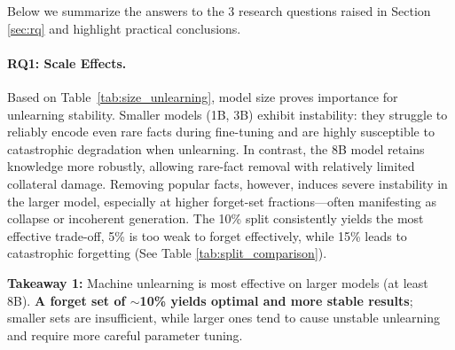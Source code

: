 \documentclass[11pt]{article}
\begin{document}
{    %

    

Below we summarize the answers to the 3 research questions raised in Section \ref{sec:rq} and highlight practical conclusions.

\paragraph{RQ1: Scale Effects.}  
Based on Table~\ref{tab:size_unlearning}, model size proves importance for unlearning stability. Smaller models (1B, 3B) exhibit instability: they struggle to reliably encode even rare facts during fine-tuning and are highly susceptible to catastrophic degradation when unlearning. In contrast, the 8B model retains knowledge more robustly, allowing rare-fact removal with relatively limited collateral damage. Removing popular facts, however, induces severe instability in the larger model, especially at higher forget-set fractions—often manifesting as collapse or incoherent generation. The 10\% split consistently yields the most effective trade-off, 5\% is too weak to forget effectively, while 15\% leads to catastrophic forgetting (See Table \ref{tab:split_comparison}).

\begin{tcolorbox}[colback=gray!10, colframe=black!50, 
  boxrule=0.5pt, arc=3pt, left=6pt, right=6pt, top=4pt, bottom=4pt]
\textbf{Takeaway 1:} Machine unlearning is most effective on larger models (at least 8B). \textbf{A forget set of $\sim$10\% yields optimal and more stable results}; smaller sets are insufficient, while larger ones tend to cause unstable unlearning and require more careful parameter tuning.
\end{tcolorbox}

}
\end{document}

